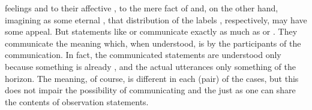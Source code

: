 feelings and  to their affective , to the mere fact of
 and, on the other hand, imagining 
as some eternal , that distribution of the  labels
, respectively,  may have some appeal. But
statements like  or  communicate
exactly as much as  or . They
communicate the meaning which, when understood, is  by the
participants of the communication. In fact, the communicated statements are
understood only because something is already , and the actual
utterances only  something of the  horizon. The
meaning, of course, is different in each (pair) of the cases, but this does not
impair the possibility of communicating and  the  just as
one can {share} the  contents of observation statements.

